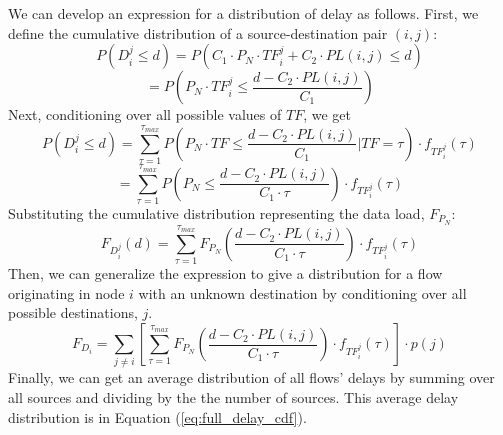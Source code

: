 We can develop an expression for a distribution of delay as follows.  First, we define the cumulative distribution of a source-destination pair $(i,j)$:
\begin{equation*}
	P( D_{i}^{j} \leq d ) = P( C_1 \cdot P_N \cdot TF_{i}^{j} + C_2 \cdot PL(i,j) \leq d )
\end{equation*}
\begin{equation*}
	= P( P_N \cdot TF_{i}^{j} \leq \frac{d - C_2 \cdot PL(i,j)}{C_1}  )
\end{equation*}
Next, conditioning over all possible values of $TF$, we get
\begin{equation*}
	P( D_{i}^{j} \leq d ) = \sum\limits_{\tau = 1}^{\tau_{max}} P( P_N \cdot TF \leq \frac{d - C_2 \cdot PL(i,j)}{C_1} | TF = \tau ) \cdot f_{TF_{i}^{j}}(\tau)
\end{equation*}
\begin{equation*}
	= \sum\limits_{\tau = 1}^{\tau_{max}} P( P_N \leq \frac{d - C_2 \cdot PL(i,j)}{C_1 \cdot \tau} ) \cdot f_{TF_{i}^{j}}(\tau)
\end{equation*}
Substituting the cumulative distribution representing the data load, $F_{P_{N}}$:
\begin{equation*}
	F_{D_{i}^{j}}(d) = \sum\limits_{\tau = 1}^{\tau_{max}} F_{P_N}( \frac{d - C_2 \cdot PL(i,j)}{C_1 \cdot \tau} ) \cdot f_{TF_{i}^{j}}(\tau)
\end{equation*}
Then, we can generalize the expression to give a distribution for a flow originating in node $i$ with an unknown destination by conditioning over all possible destinations, $j$.
\begin{equation}
\label{eq:delay_dist_pdf_i}
	F_{D_i} = \sum\limits_{j \neq i} [ \sum\limits_{\tau = 1}^{\tau_{max}} F_{P_N}( \frac{d - C_2 \cdot PL(i,j)}{C_1 \cdot \tau} ) \cdot f_{TF_{i}^{j}}(\tau) ] \cdot p(j)
\end{equation}
Finally, we can get an average distribution of all flows' delays by summing over all sources and dividing by the the number of sources.  This average delay distribution is in Equation (\ref{eq:full_delay_cdf}).


